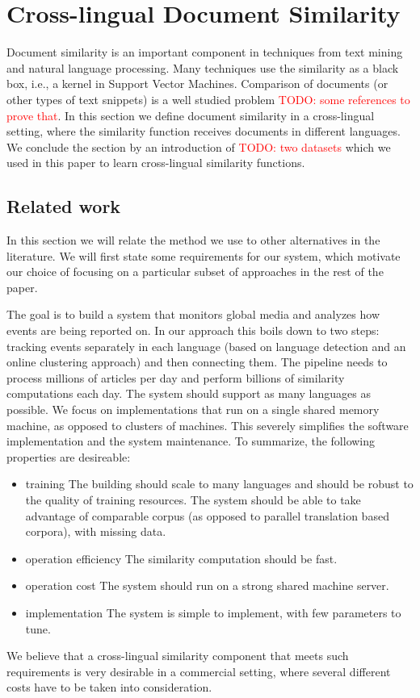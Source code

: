 \documentclass[twoside,11pt]{article}
\newcommand{\todo}[1]{\textcolor{red}{TODO: #1}}
\begin{document}
\section{Cross-lingual Document Similarity}

Document similarity is an important component in techniques from text mining and natural language processing. Many techniques use the similarity as a black box, i.e., a kernel in Support Vector Machines. Comparison of documents (or other types of text snippets) is a well studied problem \todo{some references to prove that}. In this section we define document similarity in a cross-lingual setting, where the similarity function receives documents in different languages. We conclude the section by an introduction of \todo{two datasets} which we used in this paper to learn cross-lingual similarity functions.

\subsection{Related work}

In this section we will relate the method we use to other alternatives in the literature. We will first state some requirements for our system, which motivate our choice of focusing on a particular subset of approaches in the rest of the paper.

The goal is to build a system that monitors global media and analyzes how events are being reported on. In our approach this boils down to two steps: tracking events separately in each language (based on language detection and an online clustering approach) and then connecting them. The pipeline needs to process millions of articles per day and perform billions of similarity computations each day. The system should support as many languages as possible. We focus on implementations that run on a single shared memory machine, as opposed to clusters of machines. This severely simplifies the software implementation and the system maintenance. 
To summarize, the following properties are desireable:
\begin{itemize}
\item{training} The building should scale to many languages and should be robust to the quality of training resources. The system should be able to take advantage of comparable corpus (as opposed to parallel translation based corpora), with missing data.
\item{operation efficiency} The similarity computation should be fast.
\item{operation cost} The system should run on a strong shared machine server. 
\item{implementation} The system is simple to implement, with few parameters to tune.
\end{itemize}
We believe that a cross-lingual similarity component that meets such requirements is very desirable in a commercial setting, where several different costs have to be taken into consideration.
\end{document}
